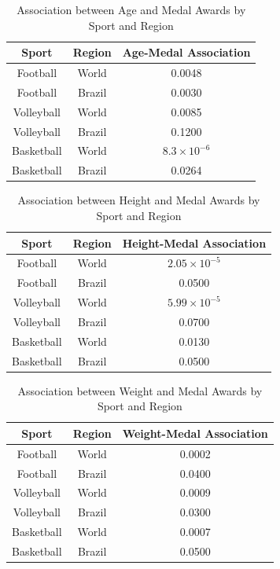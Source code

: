 \documentclass{article}
\begin{document}
\begin{table}[h!]
    \centering
    \small
    \caption{Association between Age and Medal Awards by Sport and Region}
    \begin{tabular}{|c|c|c|}
        \hline
        \textbf{Sport} & \textbf{Region} & \textbf{Age-Medal Association} \\
        \hline
        Football   & World    & 0.0048 \\
        Football   & Brazil   & 0.0030 \\
        Volleyball & World    & 0.0085 \\
        Volleyball & Brazil   & 0.1200 \\
        Basketball & World    & $8.3 \times 10^{-6}$ \\
        Basketball & Brazil   & 0.0264 \\
        \hline
    \end{tabular}
\end{table}

\begin{table}[h!]
    \centering
    \small
    \caption{Association between Height and Medal Awards by Sport and Region}
    \begin{tabular}{|c|c|c|}
        \hline
        \textbf{Sport} & \textbf{Region} & \textbf{Height-Medal Association} \\
        \hline
        Football   & World    & $2.05 \times 10^{-5}$ \\
        Football   & Brazil   & 0.0500 \\
        Volleyball & World    & $5.99 \times 10^{-5}$ \\
        Volleyball & Brazil   & 0.0700 \\
        Basketball & World    & 0.0130 \\
        Basketball & Brazil   & 0.0500 \\
        \hline
    \end{tabular}
\end{table}

\begin{table}[h!]
    \centering
    \small
    \caption{Association between Weight and Medal Awards by Sport and Region}
    \begin{tabular}{|c|c|c|}
        \hline
        \textbf{Sport} & \textbf{Region} & \textbf{Weight-Medal Association} \\
        \hline
        Football   & World    & 0.0002 \\
        Football   & Brazil   & 0.0400 \\
        Volleyball & World    & 0.0009 \\
        Volleyball & Brazil   & 0.0300 \\
        Basketball & World    & 0.0007 \\
        Basketball & Brazil   & 0.0500 \\
        \hline
    \end{tabular}
\end{table}
\end{document}
